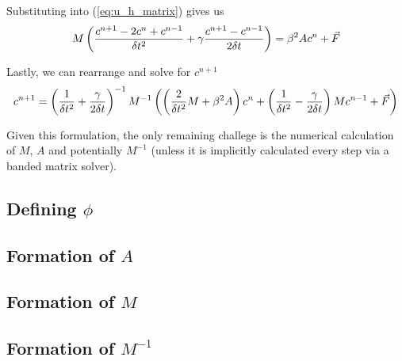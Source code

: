 \documentclass[a4paper,12pt]{article}
\begin{document}
Substituting into (\ref{eq:u_h_matrix}) gives us
\begin{equation} \label{eq:finite_diff_weak_form}
M \left( \frac{c^{n+1} - 2c^n + c^{n-1}}{\delta t^2} + \gamma \frac{c^{n+1} - c^{n-1}}{2\delta t} \right) = \beta^2 A c^n + \vec{F}
\end{equation}

Lastly, we can rearrange and solve for $c^{n+1}$
\begin{equation} \label{eq:finite_diff_solution}
c^{n+1} = \left( \frac{1}{\delta t^2} + \frac{\gamma}{2\delta t} \right)^{-1} M^{-1}
\left(
\left( \frac{2}{\delta t^2}M + \beta^2 A \right) c^n
+
\left( \frac{1}{\delta t^2} - \frac{\gamma}{2\delta t} \right) M c^{n-1}
+
\vec{F}
\right)
\end{equation}

Given this formulation, the only remaining challege is the numerical calculation of $M$, $A$ and potentially
$M^{-1}$ (unless it is implicitly calculated every step via a banded matrix solver).

\subsection{Defining $\phi$}
\subsection{Formation of $A$}
\subsection{Formation of $M$}
\subsection{Formation of $M^{-1}$}



\end{document}
